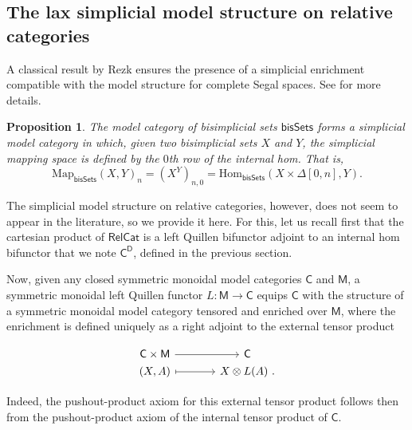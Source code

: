 \documentclass[a4paper,12pt]{amsart}
\theoremstyle{plain}
\newtheorem{proposition}[theorem]{Proposition}%
\theoremstyle{definition}
\theoremstyle{remark}
\begin{document}
\subsection{The lax simplicial model structure on relative categories}
A classical result by Rezk ensures the presence of a simplicial enrichment compatible with the model structure for complete Segal spaces. See \cite{Rezk01} for more details. 

\begin{proposition}
The model category of bisimplicial sets $\mathsf{bisSets}$ forms a simplicial model category in which, given two bisimplicial sets $X$ and $Y$, the simplicial mapping space is defined by the $0$th row of the internal hom. That is,
\[
\mathrm{Map}_{\mathsf{bisSets}}(X,Y)_n = (X^Y)_{n,0} = \mathrm{Hom}_{\mathsf{bisSets}}(X\times\Delta[0,n],Y).
\]
\end{proposition}

The simplicial model structure on relative categories, however, does not seem to appear in the literature, so we provide it here. For this, let us recall first that the cartesian product of  $\mathsf{RelCat}$ is a left Quillen bifunctor adjoint to an internal hom bifunctor that we note $\mathsf{C}^{\mathsf{D}}$, defined in the previous section. 


Now, given any closed symmetric monoidal model categories $\mathsf{C}$ and $\mathsf{M}$, a symmetric monoidal left Quillen functor $L:\mathsf{M}\rightarrow\mathsf{C}$ equips $\mathsf{C}$ with the structure of a symmetric monoidal model category tensored and enriched over $\mathsf{M}$, where the enrichment is defined uniquely as a right adjoint to the external tensor product

\[
\begin{tikzcd}[column sep=3pc,row sep=0pc]
\mathsf{C}\times\mathsf{M} \arrow[r]
&\mathsf{C} \\
(X,A) \arrow[r,mapsto]
&X \otimes L(A)~. 
\end{tikzcd}
\]

Indeed, the pushout-product axiom for this external tensor product follows then from the pushout-product axiom of the internal tensor product of $\mathsf{C}$.

\end{document}
